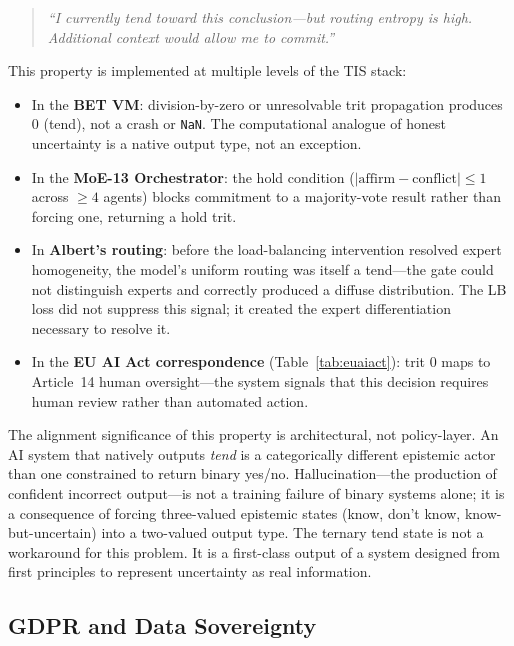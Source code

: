 \documentclass[journal,10pt,twocolumn]{IEEEtran}
\begin{document}
\begin{quote}
  \emph{``I currently tend toward this conclusion---but routing entropy is
  high. Additional context would allow me to commit.''}
\end{quote}

This property is implemented at multiple levels of the TIS stack:

\begin{itemize}
  \item In the \textbf{BET VM}: division-by-zero or unresolvable trit
        propagation produces $0$ (tend), not a crash or \texttt{NaN}.
        The computational analogue of honest uncertainty is a native output
        type, not an exception.
  \item In the \textbf{MoE-13 Orchestrator}: the hold condition
        ($|\text{affirm} - \text{conflict}| \leq 1$ across $\geq 4$ agents)
        blocks commitment to a majority-vote result rather than forcing one,
        returning a hold trit.
  \item In \textbf{Albert's routing}: before the load-balancing intervention
        resolved expert homogeneity, the model's uniform routing was itself
        a tend---the gate could not distinguish experts and correctly produced
        a diffuse distribution. The LB loss did not suppress this signal; it
        created the expert differentiation necessary to resolve it.
  \item In the \textbf{EU AI Act correspondence}
        (Table~\ref{tab:euaiact}): trit $0$ maps to Article~14 human
        oversight---the system signals that this decision requires human
        review rather than automated action.
\end{itemize}

The alignment significance of this property is architectural, not
policy-layer. An AI system that natively outputs \emph{tend} is a
categorically different epistemic actor than one constrained to return
binary yes/no. Hallucination---the production of confident incorrect
output---is not a training failure of binary systems alone; it is a
consequence of forcing three-valued epistemic states (know, don't know,
know-but-uncertain) into a two-valued output type. The ternary tend state
is not a workaround for this problem. It is a first-class output of a
system designed from first principles to represent uncertainty as real
information.

\subsection{GDPR and Data Sovereignty}
\end{document}
